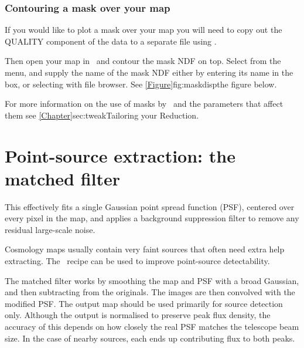 \subsubsection{Contouring a mask over your map}
If you would like to plot a mask over your map you will need to copy
out the QUALITY component of the data to a separate file using
.
\begin{terminalv}
\end{terminalv}
Then open your map in \gaia\ and contour the mask NDF on top.
Select  from the 
menu, and supply the name of the mask NDF either by entering its name in
the  box, or selecting with
 file browser. See
\cref{Figure}{fig:maskdisp}{the figure below}.

For more information on the use of masks by \makemap\ and the
parameters that affect them see \cref{Chapter}{sec:tweak}{Tailoring
your Reduction}.



\section{Point-source extraction: the matched filter}
\label{sec:mf}

This effectively fits a single Gaussian point spread function (PSF),
centered over every pixel in the map, and applies a background
suppression filter to remove any residual large-scale noise.

Cosmology maps usually contain very faint sources that often need
extra help extracting. The \picard\ recipe
can be used to improve point-source detectability.

The matched filter works by smoothing the map and PSF with a broad
Gaussian, and then subtracting from the originals. The images are then
convolved with the modified PSF. The output map should be used
primarily for source detection only. Although the output is normalised
to preserve peak flux density, the accuracy of this depends on how
closely the real PSF matches the telescope beam size. In the case of
nearby sources, each ends up contributing flux to both peaks.

